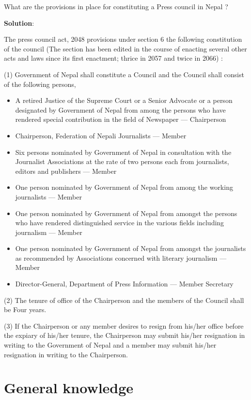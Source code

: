 \documentclass[
]{book}
\newcommand{\question}{\item}
\newenvironment{solution}{ {\bfseries Solution}:}{}
\begin{document}
\begin{questions}
\question What are the provisions in place for constituting a Press council in Nepal ?

\begin{solution}

The press council act, 2048 provisions under section 6 the following constitution of the council (The section has been edited in the course of enacting several other acts and laws since its first enactment; thrice in 2057 and twice in 2066) :

(1) Government of Nepal shall constitute a Council and the Council shall consist of the following persons,

\begin{itemize}
\item A retired Justice of the Supreme Court or a Senior Advocate or a person designated by Government of Nepal from among the persons who have rendered special contribution in the field of Newspaper --- Chairperson
\item Chairperson, Federation of Nepali Journalists --- Member
\item Six persons nominated by Government of Nepal in consultation with the Journalist Associations at the rate of two persons each from journalists, editors and publishers --- Member
\item One person nominated by Government of Nepal from among the working journalists --- Member
\item One person nominated by Government of Nepal from amongst the persons who have rendered distinguished service in the various fields including journalism --- Member
\item One person nominated by Government of Nepal from  amongst the journalists as recommended by Associations concerned with literary journalism --- Member
\item Director-General, Department of Press Information --- Member Secretary
\end{itemize}

(2) The tenure of office of the Chairperson and the members of the Council shall be Four years.

(3) If the Chairperson or any member desires to resign from his/her office before the expiary of his/her tenure, the Chairperson may submit his/her resignation in writing to the Government of Nepal and a member may submit his/her resignation in writing to the Chairperson.

\end{solution}

\end{questions}

\hypertarget{general-knowledge}{%
\chapter{General knowledge}\label{general-knowledge}}



  
\end{document}

